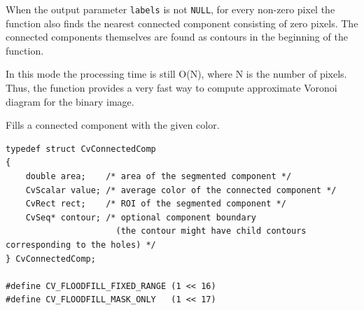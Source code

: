 When the output parameter \texttt{labels} is not \texttt{NULL}, for
every non-zero pixel the function also finds the nearest connected
component consisting of zero pixels. The connected components
themselves are found as contours in the beginning of the function.

In this mode the processing time is still O(N), where N is the number of
pixels. Thus, the function provides a very fast way to compute approximate
Voronoi diagram for the binary image.

Fills a connected component with the given color.


\ifC
\begin{lstlisting}
typedef struct CvConnectedComp
{
    double area;    /* area of the segmented component */
    CvScalar value; /* average color of the connected component */
    CvRect rect;    /* ROI of the segmented component */
    CvSeq* contour; /* optional component boundary
                      (the contour might have child contours corresponding to the holes) */
} CvConnectedComp;

#define CV_FLOODFILL_FIXED_RANGE (1 << 16)
#define CV_FLOODFILL_MASK_ONLY   (1 << 17)
\end{lstlisting}
\fi

